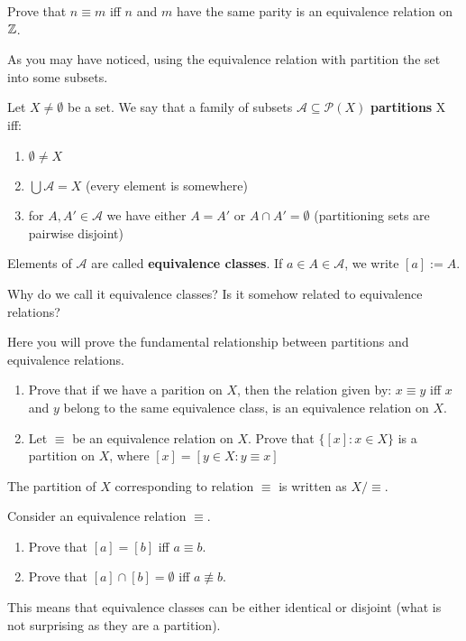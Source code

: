 \begin{exercise}
  Prove that $n\equiv m$ iff $n$ and $m$ have the same parity is an equivalence relation on $\mathbb Z$.
\end{exercise}

As you may have noticed, using the equivalence relation with partition the set into some subsets.

\begin{definition}
  Let $X\neq \emptyset$ be a set. We say that a family of subsets $\mathcal A\subseteq \mathcal P(X)$ \textbf{partitions} X iff:
  \begin{enumerate}
    \item $\emptyset \neq X$
    \item $\bigcup \mathcal A=X$ (every element is somewhere)
    \item for $A,A'\in \mathcal A$ we have either $A=A'$ or $A\cap A'=\emptyset$ (partitioning sets are pairwise disjoint)
  \end{enumerate}
  Elements of $\mathcal A$ are called \textbf{equivalence classes}. If $a\in A\in\mathcal A$, we write $[a]:=A$.
\end{definition}

Why do we call it equivalence classes? Is it somehow related to equivalence relations?

\begin{exercise}
  Here you will prove the fundamental relationship between partitions and equivalence relations.
  \begin{enumerate}
    \item Prove that if we have a parition on $X$, then the relation given by: $x\equiv y$ iff $x$ and $y$ belong to the same equivalence class, is an equivalence relation on $X$.
    \item Let $\equiv$ be an equivalence relation on $X$. Prove that $\{[x] : x\in X\}$ is a partition on $X$, where $[x]=[y\in X : y\equiv x]$
  \end{enumerate}
  The partition of $X$ corresponding to relation $\equiv$ is written as $X/\equiv.$
\end{exercise}

\begin{exercise}
  Consider an equivalence relation $\equiv$.
  \begin{enumerate}
    \item Prove that $[a]=[b]$ iff $a\equiv b$.
    \item Prove that $[a]\cap [b]=\emptyset$ iff $a\not\equiv b$.
  \end{enumerate}
  This means that equivalence classes can be either identical or disjoint (what is not surprising as they are a partition).
\end{exercise}

